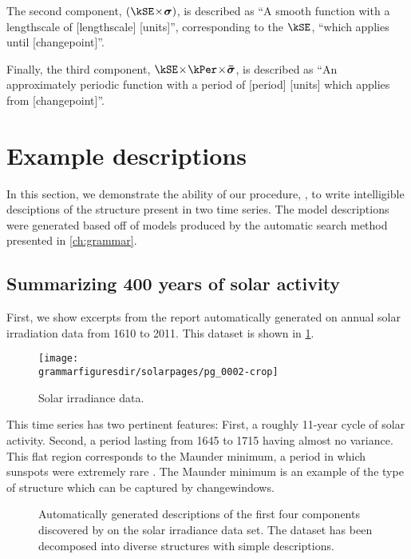 The second component, $(\kSE \kerntimes \vsigma)$, is described as ``A smooth function with a lengthscale of [lengthscale] [units]'', corresponding to the $\kSE$, ``which applies until [changepoint]''.

Finally, the third component, $\kSE \kerntimes \kPer \kerntimes \boldsymbol{\bar\sigma}$, is described as ``An approximately periodic function with a period of [period] [units] which applies from [changepoint]''.






\section{Example descriptions}
\label{sec:example-descriptions}
In this section, we demonstrate the ability of our procedure, \procedurename, to write intelligible desciptions of the structure present in two time series.
The model descriptions were generated based off of models produced by the automatic search method presented in \cref{ch:grammar}.


\subsection{Summarizing 400 years of solar activity}
\label{sec:solar}

First, we show excerpts from the report automatically generated on annual solar irradiation data from 1610 to 2011.
This dataset is shown in \cref{fig:solar}.
%
\begin{figure}[ht!]
\centering
\texttt{[image: \\grammarfiguresdir/solarpages/pg\_0002-crop]}
\caption[Solar irradiance dataset]
{Solar irradiance data.}
\label{fig:solar}
\end{figure}

This time series has two pertinent features: 
First, a roughly 11-year cycle of solar activity.
Second, a period lasting from 1645 to 1715 having almost no variance.
This flat region corresponds to the Maunder minimum, a period in which sunspots were extremely rare \citep{lean1995reconstruction}.
The Maunder minimum is an example of the type of structure which can be captured by changewindows.

\begin{figure}[ht!]
\centering
{}
\caption[Automatically-generated description of the solar irradiance data set]
{Automatically generated descriptions of the first four components discovered by \procedurename{} on the solar irradiance data set.
The dataset has been decomposed into diverse structures with simple descriptions.}
\label{fig:exec}
\end{figure}

